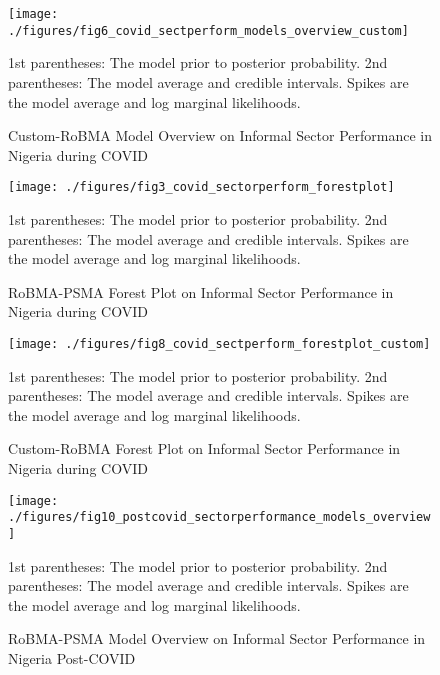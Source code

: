 \documentclass[a4paper, 12pt]{article}
\begin{document}
    \begin{figure}[H]
        \centering
        \texttt{[image: ./figures/fig6\_covid\_sectperform\_models\_overview\_custom]}
        \caption{Custom-RoBMA Model Overview on Informal Sector Performance in Nigeria during COVID}
        \label{fig15:custom-robma-model-overview-covid}
        \begin{minipage}{10cm}
            \vspace{0.1cm}
            \small 1st parentheses: The model prior to posterior probability. 2nd parentheses: The model average and credible intervals. Spikes are the model average and log marginal likelihoods.
        \end{minipage}
    \end{figure}

    \begin{figure}[H]
        \centering
        \texttt{[image: ./figures/fig3\_covid\_sectorperform\_forestplot]}
        \caption{RoBMA-PSMA Forest Plot on Informal Sector Performance in Nigeria during COVID}
        \label{fig16:robma-psma-forest-plot-covid}
        \begin{minipage}{10cm}
            \vspace{0.1cm}
            \small 1st parentheses: The model prior to posterior probability. 2nd parentheses: The model average and credible intervals. Spikes are the model average and log marginal likelihoods.
        \end{minipage}
    \end{figure}

    \begin{figure}[H]
        \centering
        \texttt{[image: ./figures/fig8\_covid\_sectperform\_forestplot\_custom]}
        \caption{Custom-RoBMA Forest Plot on Informal Sector Performance in Nigeria during COVID}
        \label{fig17:custom-robma-forest-plot-covid}
        \begin{minipage}{10cm}
            \vspace{0.1cm}
            \small 1st parentheses: The model prior to posterior probability. 2nd parentheses: The model average and credible intervals. Spikes are the model average and log marginal likelihoods.
        \end{minipage}
    \end{figure}

    \begin{figure}[H]
        \centering
        \texttt{[image: ./figures/fig10\_postcovid\_sectorperformance\_models\_overview]}
        \caption{RoBMA-PSMA Model Overview on Informal Sector Performance in Nigeria Post-COVID}
        \label{fig18:robma-psma-model-overview-postcovid}
        \begin{minipage}{10cm}
            \vspace{0.1cm}
            \small 1st parentheses: The model prior to posterior probability. 2nd parentheses: The model average and credible intervals. Spikes are the model average and log marginal likelihoods.
        \end{minipage}
    \end{figure}
\end{document}
